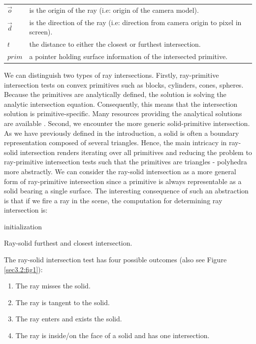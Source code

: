 \documentclass[a4paper,11pt,oneside]{article}
\makeatletter
\newenvironment{conditions}
  {\par\vspace{\abovedisplayskip}\noindent\begin{tabular}{>{$}l<{$} @{${}={}$} l}}
  {\end{tabular}\par\vspace{\belowdisplayskip}}
\makeatother
\begin{document}
\begin{conditions}
	\vec{o}     &  is the origin of the ray (i.e: origin of the camera model). \\
	\vec{d}     &  is the direction of the ray (i.e: direction from camera origin to pixel in screen). \\
	t     &  the distance to either the closest or furthest intersection. \\
	prim    &  a pointer holding surface information of the intersected primitive. 
\end{conditions}

We can distinguish two types of ray intersections. Firstly, ray-primitive intersection tests on convex primitives such as blocks, cylinders, cones, spheres. Because the primitives are analytically defined, the solution is solving the analytic intersection equation. Consequently, this means that the intersection solution is primitive-specific. Many resources providing the analytical solutions are available \cite{ray_primitive_intersections}.
Second, we encounter the more generic solid-primitive intersection. As we have previously defined in the introduction, a solid is often a boundary representation composed of several triangles. Hence, the main intricacy in ray-solid intersection renders iterating over all primitives and reducing the problem to ray-primitive intersection tests such that the primitives are triangles - polyhedra more abstractly.
We can consider the ray-solid intersection as a more general form of ray-primitive intersection since a primitive is always representable as a solid bearing a single surface. The interesting consequence of such an abstraction is that if we fire a ray in the scene, the computation for determining ray intersection is:

\begin{algorithm}[H]
	\SetAlgoLined
	initialization\;
	\caption{Ray-solid furthest and closest intersection.}
\end{algorithm}

The ray-solid intersection test has four possible outcomes (also see Figure \ref{sec3.2:fig1}):
\begin{enumerate}
	\item The ray misses the solid.
	\item The ray is tangent to the solid.
	\item The ray enters and exists the solid.
	\item The ray is inside/on the face of a solid and has one intersection.
\end{enumerate}
\end{document}
